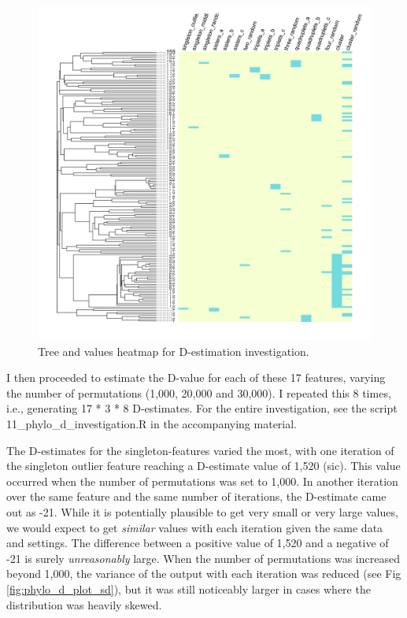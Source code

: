 \documentclass[12pt,letterpaper]{article}
\begin{document}
\begin{figure}[!ht]
\centering
\includegraphics[width=14cm]{illustrations/plots_from_R/phylo_d_heatmap_tree.png}
\caption{Tree and values heatmap for D-estimation investigation.}
\label{fig:phylo_d_heatmap}
\end{figure}

I then proceeded to estimate the D-value for each of these 17 features, varying the number of permutations (1,000, 20,000 and 30,000). I repeated this 8 times, i.e., generating 17 * 3 * 8 D-estimates. For the entire investigation, see the script 11\_phylo\_d\_investigation.R in the accompanying material.

The D-estimates for the singleton-features varied the most, with one iteration of the singleton outlier feature reaching a D-estimate value of 1,520 (sic). This value occurred when the number of permutations was set to 1,000. In another iteration over the same feature and the same number of iterations, the D-estimate came out as -21. While it is potentially plausible to get very small or very large values, we would expect to get \emph{similar} values with each iteration given the same data and settings. The difference between a positive value of 1,520 and a negative of -21 is surely \emph{unreasonably} large. When the number of permutations was increased beyond 1,000, the variance of the output with each iteration was reduced (see Fig \ref{fig:phylo_d_plot_sd}), but it was still noticeably larger in cases where the distribution was heavily skewed.
\end{document}
